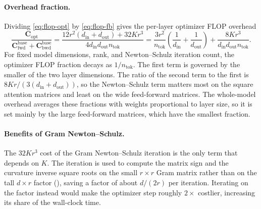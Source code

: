 \documentclass[11pt]{article}
\newcommand{\mat}[1]{\bm{#1}}
\begin{document}
\paragraph{Overhead fraction.} Dividing \eqref{eq:flop-opt} by \eqref{eq:flop-fb} gives the
per-layer optimizer FLOP overhead 
\begin{equation}
  \frac{\mat{C}_{\mathrm{opt}}}{\mat{C}_{\mathrm{fwd}}^{\mathrm{base}}
  +\mat{C}_{\mathrm{bwd}}^{\mathrm{base}}}
  =
  \frac{
    12r^2(d_{\mathrm{in}}+d_{\mathrm{out}})
    +
    32Kr^3
  }{
    4d_{\mathrm{in}}d_{\mathrm{out}}n_{\mathrm{tok}}
  }
  =
  \frac{3r^2}{n_{\mathrm{tok}}}
  \left(
    \frac1{d_{\mathrm{in}}}
    +
    \frac1{d_{\mathrm{out}}}
  \right)
  +
  \frac{
    8Kr^3
  }{
    d_{\mathrm{in}}d_{\mathrm{out}}n_{\mathrm{tok}}
  } .
  \label{eq:flop-ratio}
\end{equation}
For fixed model dimensions, rank, and Newton--Schulz iteration count, the
optimizer FLOP fraction decays as $1/n_{\mathrm{tok}}$.
The first term is
governed by the smaller of the two layer dimensions. The ratio of the second term to the
first is $8Kr/(3(d_{\mathrm{in}}+d_{\mathrm{out}}))$, so the Newton--Schulz term matters
most on the square attention matrices and least on the wide feed-forward matrices.
The whole-model overhead averages these fractions with weights proportional to layer size,
so it is set mainly by the large feed-forward matrices, which have the smallest fraction.

\paragraph{Benefits of Gram Newton--Schulz.} The $32Kr^3$ cost of the Gram Newton--Schulz iteration is the only term that depends
on $K$. The iteration is used to compute the matrix sign and the curvature inverse square
roots on the small $r\times r$ Gram matrix rather than on the tall $d\times r$ factor
(), saving a factor of about $d/(2r)$ per iteration. Iterating on the factor
instead would make the optimizer step roughly $2\times$ costlier, increasing its share of
the wall-clock time.
\end{document}
